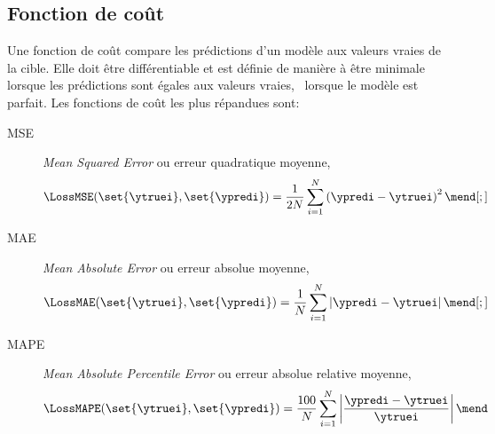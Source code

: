\subsection{Fonction de coût}\label{chapter-ML-section-loss}
Une fonction de coût compare les prédictions d'un modèle aux valeurs vraies de la cible.
Elle doit être différentiable et est définie de manière à être minimale lorsque les prédictions sont égales aux valeurs vraies, \ie\ lorsque le modèle est parfait.
Les fonctions de coût les plus répandues sont:
\begin{description}
\item[MSE] \emph{Mean Squared Error} ou erreur quadratique moyenne,
\begin{equation}
\LossMSE(\set{\ytruei}, \set{\ypredi}) = \frac{1}{2N} \sum_{i=1}^N \left( \ypredi - \ytruei \right)^2
\label{eq-loss_MSE}
\mend[;]
\end{equation}
\item[MAE] \emph{Mean Absolute Error} ou erreur absolue moyenne,
\begin{equation}
\LossMAE(\set{\ytruei}, \set{\ypredi}) = \frac{1}{N} \sum_{i=1}^N \left| \ypredi - \ytruei \right|
\label{eq-loss_MAE}
\mend[;]
\end{equation}
\item[MAPE] \emph{Mean Absolute Percentile Error} ou erreur absolue relative moyenne,
\begin{equation}
\LossMAPE(\set{\ytruei}, \set{\ypredi}) = \frac{100}{N} \sum_{i=1}^N \left| \frac{\ypredi - \ytruei}{\ytruei} \right|
\label{eq-loss_MAPE}
\mend
\end{equation}
\end{description}
